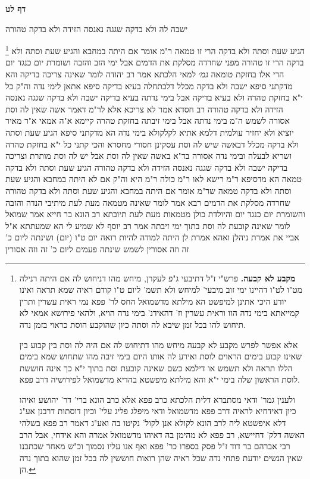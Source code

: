 \documentclass[12pt, openany]{book}
\newcommand{\sethebfont}{
\fontsize{10.5pt}{21.0pt} \selectfont
}
\newcommand{\twocol}[1]{
	{\sethebfont \begin{multicols}{2}
			#1
	\end{multicols}}	
}
\newcommand{\sectname}{}
\newcommand{\newsection}[1]{
	\addcontentsline{toc}{section}{#1}
	\renewcommand{\sectname}{#1}	
	\vspace{-\baselineskip}
	\begin{center}
		\textbf{%
\fontsize{16pt}{16pt}\selectfont
			#1}
	\end{center}
	\vspace{-\baselineskip}
	\nopagebreak
}
\newcommand{\footnotecomment}[1]{
	\renewcommand\thefootnote{}
	\footnote{#1}}
\newcommand{\commenta}[1]{\footnotecomment{#1}}
\begin{document}
\newsection{דף לט}
\twocol{ישבה לה ולא בדקה שגגה נאנסה הזידה ולא בדקה טהורה 
\commenta{\textbf{מקבע לא קבעה.} פרש"י ז"ל דתיבעי ג"פ לעקרן, מיחש מהו דניחוש לה אם היתה רנילה מט"ו לט"ו דהיינו ימי זוב מיבעי' למיחש ולא תשמ' ליום ט"ו קודם ראיה שמא תראה ואינו יודע היכי אתינן למיפשט הא מילתא מדשמואל החס לר' פפא נמי ראית עשרין ותרין קמייאתא בימי נדה הוו וראית עשרין וז' דהאידנ' בימי נדה הויא, ולהאי פירושא אמאי לא תיחוש להו בכל זמן שיבא לה וסתה כיון שהוקבע הוסת כראוי בזמן נדה.\par אלא אפשר לפרש מקבע לא קבעה מיחש מהו דתיחוש לה אם היה לה וסת בין קבוע בין שאינו קבוע בימים הראוים לוסת ואירע לה אותו היום בימי זיבה מהו שתחוש שמא בימים הללו תראה ולא תשמש או דילמא כשם שאינה קובעת וסת בתוך י"א כך אינה חוששת לוסת הראשון שלה בימי י"א והא מילתא מיפשטא בהדיא מדשמואל לפירושיה דרב פפא.\par ולענין גמר' ודאי מסתברא דלית הלכתא כרב פפא אלא כרב הונא ברי' דר' יהושע ואיהו כיון דאידחיא לראיה דרב פפא מדשמואל ודאי מיפלג פליג עלי' וכיון דוסתות דרבנן אע"ג דלא איפשטא ליה לרב הונא לקולא אנן לקול' נקיטו בה ואע"ג דאמר רב פפא בשלהי האשה דלק' דחיישא, רב פפא לא מהימן בה דאיהו מדשמואל אמרה והא אידחי, אבל הרב רבי אברהם בר דוד ז"ל פסק בספרו כר' פפא ואף אנו עליו נסמוך וכ"ש מאחר שכתבנו שאין הנשים יודעת פתחי נדה שכל ראיה שהן רואות חוששין לה בכל זמן שהוא בתוך נדה הן. }
הגיע שעת וסתה ולא בדקה הרי זו טמאה ר"מ אומר אם היתה במחבא והגיע שעת וסתה ולא בדקה הרי זו טהורה מפני שחרדה מסלקת את הדמים 
אבל ימי הזב והזבה ושומרת יום כנגד יום הרי אלו בחזקת טומאה
{\large\emph{גמ׳}} למאי הלכתא אמר רב יהודה לומר שאינה צריכה בדיקה והא מדקתני סיפא ישבה ולא בדקה מכלל דלכתחלה בעיא בדיקה 
סיפא אתאן לימי נדה וה"ק כל י"א בחזקת טהרה ולא בעיא בדיקה אבל בימי נדתה בעיא בדיקה ישבה ולא בדקה שגגה נאנסה הזידה ולא בדקה טהורה 
רב חסדא אמר לא צריכא אלא לר"מ דאמר אשה שאין לה וסת אסורה לשמש ה"מ בימי נדתה אבל בימי זיבתה בחזקת טהרה קיימא 
א"ה אמאי א"ר מאיר יוציא ולא יחזיר עולמית דלמא אתיא לקלקולא בימי נדה 
הא מדקתני סיפא הגיע שעת וסתה ולא בדקה מכלל דבאשה שיש לה וסת עסקינן חסורי מחסרא והכי קתני כל י"א בחזקת טהרה ושריא לבעלה ובימי נדה אסורה 
בד"א באשה שאין לה וסת אבל יש לה וסת מותרת וצריכה בדיקה ישבה ולא בדקה שגגה נאנסה הזידה ולא בדקה טהורה הגיע שעת וסתה ולא בדקה טמאה 
הא מדסיפא ר"מ רישא לאו ר"מ כולה ר"מ היא וה"ק אם לא היתה במחבא והגיע שעת וסתה ולא בדקה טמאה שר"מ אומר אם היתה במחבא והגיע שעת וסתה ולא בדקה טהורה שחרדה מסלקת את הדמים 
רבא אמר לומר שאינה מטמאה מעת לעת 
מיתיבי הנדה והזבה והשומרת יום כנגד יום והיולדת כולן מטמאות מעת לעת תיובתא 
רב הונא בר חייא אמר שמואל לומר שאינה קובעת לה וסת בתוך ימי זיבתה אמר רב יוסף לא שמיע לי הא שמעתתא 
א"ל אביי את אמרת ניהלן ואהא אמרת לן היתה למודה להיות רואה יום ט"ו (יום) ושינתה ליום כ' זה וזה אסורין לשמש שינתה פעמים ליום כ' זה וזה אסורין 
}
\end{document}
